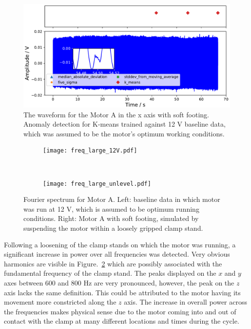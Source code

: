 \begin{figure}[t]
    \includegraphics[width=1.0\textwidth]{fig/large_unlevel_large_12V.pdf}
    \caption[Anomaly Tests Large Motor Uneven Footing]{The waveform for the Motor A in the x axis with soft footing. Anomaly detection for K-means trained against 12 V baseline data, which was assumed to be the motor's optimum working conditions.}
    \label{fig:large_uneven_footing}
\end{figure}



\begin{figure}[t!]
    \centering
    \begin{subfigure}[t]{0.5\textwidth}
        \centering
        \texttt{[image: freq\_large\_12V.pdf]}
    \end{subfigure}%
    ~ 
    \begin{subfigure}[t]{0.5\textwidth}
        \centering
        \texttt{[image: freq\_large\_unlevel.pdf]}
    \end{subfigure}
    \caption[Fourier Plot Soft Footing]{Fourier spectrum for Motor A. Left: baseline data in which motor was run at 12 V, which is assumed to be optimum running conditions. Right: Motor A with soft footing, simulated by suspending the motor within a loosely gripped clamp stand. }
    \label{soft_footing}
\end{figure}

Following a loosening of the clamp stands on which the motor was running, a significant increase in power over all frequencies was detected. Very obvious harmonics are visible in Figure.~\ref{soft_footing} which are possibly associated with the fundamental frequency of the clamp stand. The peaks displayed on the $x$ and $y$ axes between 600 and 800 Hz are very pronounced, however, the peak on the $z$ axis lacks the same definition. This could be attributed to the motor having its movement more constricted along the $z$ axis. The increase in overall power across the frequencies makes physical sense due to the motor coming into and out of contact with the clamp at many different locations and times during the cycle.

